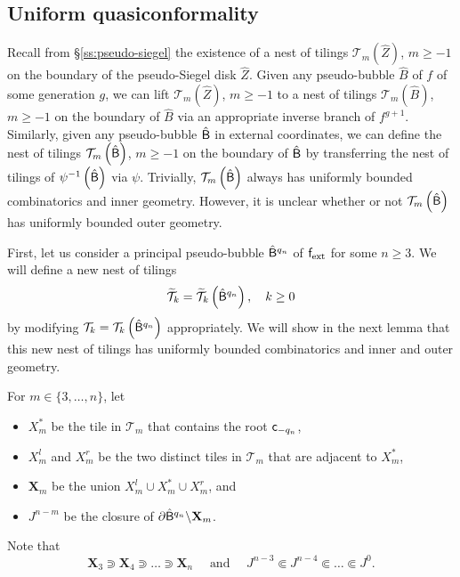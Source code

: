 \documentclass{amsart}
\begin{document}
\subsection{Uniform quasiconformality}
\label{ss:uniform-qc}

Recall from \S\ref{ss:pseudo-siegel} the existence of a nest of tilings $\mathcal{T}_m(\hat{Z})$, $m\geq -1$ on the boundary of the pseudo-Siegel disk $\hat{Z}$. Given any pseudo-bubble $\hat{B}$ of $f$ of some generation $g$, we can lift $\mathcal{T}_m\left(\hat{Z}\right)$, $m\geq -1$ to a nest of tilings $\mathcal{T}_m\left(\hat{B}\right)$, $m\geq -1$ on the boundary of $\hat{B}$ via an appropriate inverse branch of $f^{g+1}$. 
Similarly, given any pseudo-bubble $\hat{\mathsf{B}}$ in external coordinates, we can define the nest of tilings $\mathcal{T}_m\left(\hat{\mathsf{B}}\right)$, $m \geq -1$ on the boundary of $\hat{\mathsf{B}}$ by transferring the nest of tilings of $\psi^{-1}\left(\hat{\mathsf{B}}\right)$ via $\psi$. 
Trivially, $\mathcal{T}_m\left(\hat{\mathsf{B}}\right)$ always has uniformly bounded combinatorics and inner geometry. However, it is unclear whether or not $\mathcal{T}_m\left(\hat{\mathsf{B}}\right)$ has uniformly bounded outer geometry.

First, let us consider a principal pseudo-bubble $\hat{\mathsf{B}}^{q_n}$ of $\mathsf{f}_{\textnormal{ext}}$ for some $n \geq 3$.
We will define a new nest of tilings 
\[
\widetilde{\mathcal{T}}_k = \widetilde{\mathcal{T}}_k \left(\hat{\mathsf{B}}^{q_n} \right), \quad k \geq 0
\]
by modifying $\mathcal{T}_k = \mathcal{T}_k \left(\hat{\mathsf{B}}^{q_n}\right)$ appropriately.
We will show in the next lemma that this new nest of tilings has uniformly bounded combinatorics and inner and outer geometry.

For $m \in \{3, \ldots, n\}$, let
\begin{itemize}
    \item $X^*_m$ be the tile in $\mathcal{T}_m$ that contains the root $\mathsf{c}_{-q_n}$, 
    \item $X^l_m$ and $X^r_m$ be the two distinct tiles in $\mathcal{T}_m$ that are adjacent to $X^*_m$, 
    \item $\mathbf{X}_m $ be the union $X_m^l \cup X_m^* \cup X_m^r$, and
    \item $J^{n-m}$ be the closure of $\partial \hat{\mathsf{B}}^{q_n} \backslash \mathbf{X}_m$.
\end{itemize}
Note that 
\[
    \mathbf{X}_3 \Supset \mathbf{X}_4 \Supset \ldots \Supset \mathbf{X}_n 
    \quad \text{ and } \quad
    J^{n-3} \Subset J^{n-4} \Subset \ldots \Subset J^0.
\]
\end{document}
